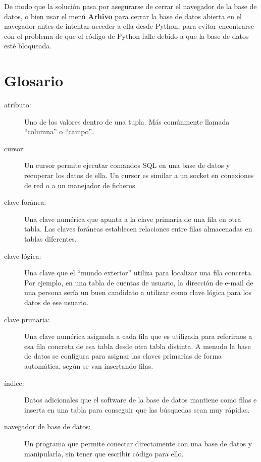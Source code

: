 De modo que la solución pasa por asegurarse de cerrar el navegador de la base de datos,
o bien usar el menú {\bf Arhivo} para cerrar la base de datos abierta en el navegador
antes de intentar acceder a ella desde Python, para evitar encontrarse con
el problema de que el código de Python falle debido a que la base de datos
esté bloqueada.

\section{Glosario}

\begin{description}

\item[atributo:] Uno de los valores dentro de una tupla. Más comúnmente
llamada ``columna'' o ``campo''..

\item[cursor:] Un cursor permite ejecutar comandos SQL en una base de datos
y recuperar los datos de ella. Un cursor es similar a un
socket en conexiones de red o a un manejador de ficheros.

\item[clave foránea:] Una clave numérica que apunta a la clave primaria de
una fila en otra tabla. Las claves foráneas establecen relaciones entre filas
almacenadas en tablas diferentes.

\item[clave lógica:] Una clave que el ``mundo exterior'' utiliza para localizar una fila
concreta. Por ejemplo, en una tabla de cuentas de usuario, la dirección de e-mail de una persona
sería un buen candidato a utilizar como clave lógica para los datos de ese usuario.

\item[clave primaria:] Una clave numérica asignada a cada fila que es utilizada para
referirnos a esa fila concreta de esa tabla desde otra tabla distinta. A menudo la base de datos
se configura para asignar las claves primarias de forma automática, según se van insertando filas.

\item[índice:] Datos adicionales que el software de la base de datos mantiene como filas
e inserta en una tabla para conseguir que las búsquedas sean muy rápidas.

\item[navegador de base de datos:]
Un programa que permite conectar directamente con una base de datos
y manipularla, sin tener que escribir código para ello.


\end{description}
